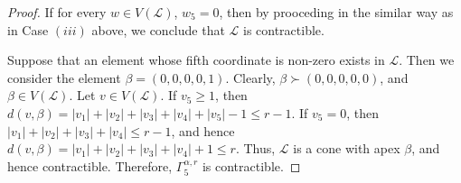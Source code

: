 \documentclass{amsart}
\theoremstyle{definition}
\theoremstyle{remark}
\numberwithin{equation}{section}
\newcommand{\samir}[1]{\textcolor{cyan!65!black}{#1}}
\begin{document}
\begin{proof}
	If for every $w \in V(\mathcal{L})$, $w_5 = 0$, then by prooceding in the similar way as in Case $(iii)$ above, we conclude that $\mathcal{L}$ is contractible.  
       
    Suppose that an element whose fifth coordinate is non-zero exists in $\mathcal{L}$. Then we consider the element $\beta = (0, 0, 0, 0,1)$. Clearly, $\beta\succ (0,0,0,0,0)$, and $\beta\in V(\mathcal{L})$. 
	Let $v \in V(\mathcal{L})$. If $v_5 \geq 1$, then $d(v, \beta) = |v_1| + |v_2| + |v_3| + |v_4| +|v_5| - 1 \leq r - 1.$ If $v_5 = 0$, then $|v_1| + |v_2| + |v_3| +|v_4| \leq r - 1$, and hence $d(v, \beta) = |v_1| + |v_2| + |v_3| + |v_4|+ 1 \leq r.$ Thus, $\mathcal{L}$ is a cone with apex $\beta$, and hence contractible. Therefore, $\Gamma_5^{\alpha,r}$ is contractible. 
\end{proof}
\end{document}
